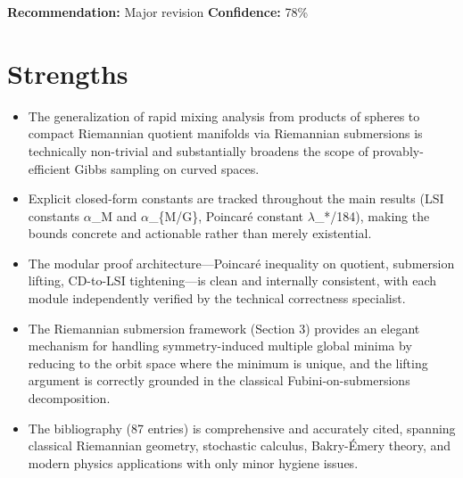 \documentclass[11pt]{article}
\begin{document}
\textbf{Recommendation:} Major revision \quad \textbf{Confidence:} 78\%\\

\section*{Strengths}
\begin{itemize}[leftmargin=*]
  \item The generalization of rapid mixing analysis from products of spheres to compact Riemannian quotient manifolds via Riemannian submersions is technically non-trivial and substantially broadens the scope of provably-efficient Gibbs sampling on curved spaces.
  \item Explicit closed-form constants are tracked throughout the main results (LSI constants \ensuremath{\alpha}\_M and \ensuremath{\alpha}\_\{M/G\}, Poincaré constant \ensuremath{\lambda}\_*/184), making the bounds concrete and actionable rather than merely existential.
  \item The modular proof architecture---Poincaré inequality on quotient, submersion lifting, CD-to-LSI tightening---is clean and internally consistent, with each module independently verified by the technical correctness specialist.
  \item The Riemannian submersion framework (Section 3) provides an elegant mechanism for handling symmetry-induced multiple global minima by reducing to the orbit space where the minimum is unique, and the lifting argument is correctly grounded in the classical Fubini-on-submersions decomposition.
  \item The bibliography (87 entries) is comprehensive and accurately cited, spanning classical Riemannian geometry, stochastic calculus, Bakry-Émery theory, and modern physics applications with only minor hygiene issues.
\end{itemize}
\end{document}
